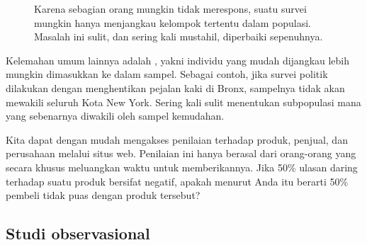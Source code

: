 \begin{figure}[h]
  \centering
  \caption{Karena sebagian orang mungkin tidak merespons,
      suatu survei mungkin hanya menjangkau kelompok tertentu
      dalam populasi. Masalah ini sulit, dan sering kali mustahil,
      diperbaiki sepenuhnya.}
  \label{surveySample}
\end{figure}

Kelemahan umum lainnya adalah
,
yakni individu yang mudah dijangkau lebih mungkin dimasukkan ke dalam sampel.
Sebagai contoh, jika survei politik dilakukan dengan menghentikan pejalan kaki
di Bronx, sampelnya tidak akan mewakili seluruh Kota New York.
Sering kali sulit menentukan subpopulasi mana yang sebenarnya diwakili oleh
sampel kemudahan.

\begin{exercisewrap}
\begin{nexercise}
Kita dapat dengan mudah mengakses penilaian terhadap produk, penjual, dan
perusahaan melalui situs web. Penilaian ini hanya berasal dari orang-orang
yang secara khusus meluangkan waktu untuk memberikannya. Jika 50\% ulasan
daring terhadap suatu produk bersifat negatif, apakah menurut Anda itu berarti
50\% pembeli tidak puas dengan produk tersebut?\footnotemark
\end{nexercise}
\end{exercisewrap}


\subsection{Studi observasional}

